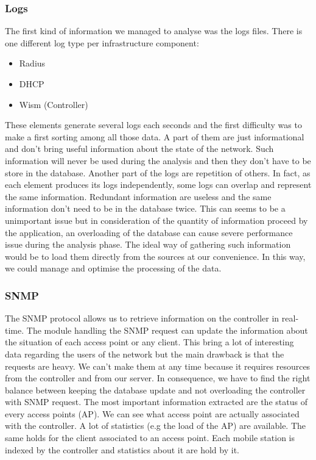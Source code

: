 \subsubsection{Logs}
The first kind of information we managed to analyse was the logs files. There is one different log type per infrastructure component:
\begin{itemize}
\item Radius
\item DHCP
\item Wism (Controller)
\end{itemize}
These elements generate several logs each seconds and the first difficulty was to make a first sorting among all those data. A part of them are just informational and don't bring useful information about the state of the network. Such information will never be used during the analysis and then they don't have to be store in the database. Another part of the logs are repetition of others. In fact, as each element produces its logs independently, some logs can overlap and represent the same information. Redundant information are useless and the same information don't need to be in the database twice. This can seems to be a unimportant issue but in consideration of the quantity of information proceed by the application, an overloading of the database can cause severe performance issue during the analysis phase.
The ideal way of gathering such information would be to load them directly from the sources at our convenience. In this way, we could manage and optimise the processing of the data.

\subsubsection{SNMP}
The SNMP protocol allows us to retrieve information on the controller in real-time. The module handling the SNMP request can update the information about the situation of each access point or any client. This bring a lot of interesting data regarding the users of the network but the main drawback is that the requests are heavy. We can't make them at any time because it requires resources from the controller and from our server. In consequence, we have to find the right balance between keeping the database update and not overloading the controller with SNMP request.
The most important information extracted are the status of every access points (AP). We can see what access point are actually associated with the controller. A lot of statistics (e.g the load of the AP) are available.
The same holds for the client associated to an access point. Each mobile station is indexed by the controller and statistics about it are hold by it.

